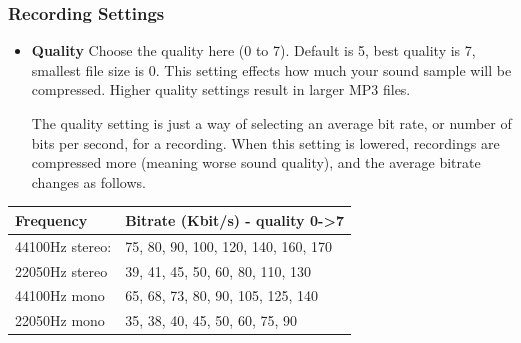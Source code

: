 \subsubsection{\label{ref:Recordingsettings}Recording Settings}
\begin{itemize}
\item \textbf{Quality}
  Choose the quality here (0 to 7). Default is 5, best quality is 7, smallest file size is 0.  This setting effects how much your sound sample will be compressed.  Higher quality settings result in larger MP3 files.

  The quality setting is just a way of selecting an average bit rate, or number of  bits per second, for a recording.  When  this setting is lowered, recordings are compressed more (meaning worse sound quality), and the average bitrate changes as follows.
\end{itemize}

\begin{table}[h!]
  \begin{center}
    \begin{tabular}{@{}ll@{}}\toprule
      \textbf{Frequency} & \textbf{Bitrate}  (Kbit/s) {}- quality 0{}-{\textgreater}7 \\\midrule
      44100Hz stereo: & 75, 80, 90, 100, 120, 140, 160, 170 \\
      22050Hz stereo & 39, 41, 45, 50, 60, 80, 110, 130 \\
      44100Hz mono & 65, 68, 73, 80, 90, 105, 125, 140 \\
      22050Hz mono & 35, 38, 40, 45, 50, 60, 75, 90 \\\bottomrule
    \end{tabular}
  \end{center}
\end{table}

